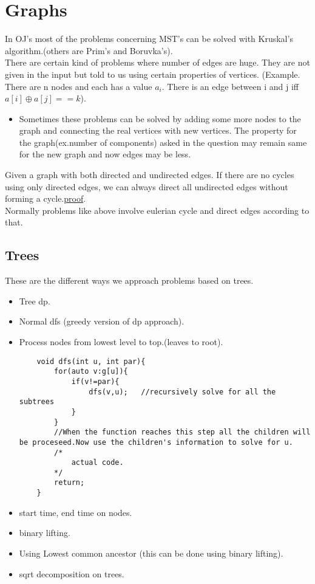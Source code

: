 \documentclass[../Notes.tex]{subfiles}
\begin{document}
\chapter{Graphs}

In OJ's most of the problems concerning MST's can be solved with Kruskal's algorithm.(others are Prim's and Boruvka's).\\ 

There are certain kind of problems where number of edges are huge. They are not given in the input but told to us using certain properties of vertices. (Example. There are n nodes and each has a value $a_{i}$. There is an edge between i and j iff $a[i]\oplus a[j]==k$).\\
\begin{itemize}
	\item Sometimes these problems can be solved by adding some more nodes to the graph and connecting the real vertices with new vertices. The property for the graph(ex.number of components) asked in the question may remain same for the new graph and now edges may be less.
\end{itemize}

Given a graph with both directed and undirected edges. If there are no cycles using only directed edges, we can always direct all undirected edges without forming a cycle.\href{./Material/Making undirected edges direct.pdf}{proof}.\\
Normally problems like above involve eulerian cycle and direct edges according to that.

\section{Trees}

These are the different ways we approach problems based on trees.
\begin{itemize}
	\item Tree dp.
	\item Normal dfs (greedy version of dp approach).
	\item Process nodes from lowest level to top.(leaves to root).
	\pagebreak
	\begin{lstlisting}
	void dfs(int u, int par){
		for(auto v:g[u]){
			if(v!=par){
				dfs(v,u);	//recursively solve for all the subtrees
			}
		}
		//When the function reaches this step all the children will be proceseed.Now use the children's information to solve for u.
		/*
			actual code.
		*/
		return;
	}
	\end{lstlisting}
	\item start time, end time on nodes.
	\item binary lifting.
	\item Using Lowest common ancestor (this can be done using binary lifting).
	\item sqrt decomposition on trees.
\end{itemize}
\end{document}
